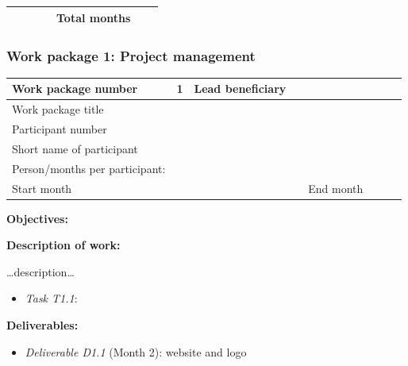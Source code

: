 \documentclass[]{article}
\begin{document}
\begin{longtable}[]{@{}lllllll@{}}
\begin{minipage}[t]{0.11\columnwidth}
\strut
\end{minipage} & \begin{minipage}[t]{0.13\columnwidth}\raggedright
\strut
\end{minipage} & \begin{minipage}[t]{0.14\columnwidth}\raggedright
\strut
\end{minipage} & \begin{minipage}[t]{0.19\columnwidth}\raggedright
\strut
\end{minipage} & \begin{minipage}[t]{0.09\columnwidth}\raggedright
Total months\strut
\end{minipage} & \begin{minipage}[t]{0.08\columnwidth}\raggedright
\strut
\end{minipage} & \begin{minipage}[t]{0.07\columnwidth}\raggedright
\strut
\end{minipage}\tabularnewline
\bottomrule
\end{longtable}

\subsubsection{Work package 1: Project management}\label{work-package-1-project-management}

\begin{longtable}[]{@{}llllllll@{}}
\toprule
Work package number & 1 & Lead beneficiary & & & & &\tabularnewline
\midrule
\endhead
Work package title & & & & & & &\tabularnewline
Participant number & & & & & & &\tabularnewline
Short name of participant & & & & & & &\tabularnewline
Person/months per participant: & & & & & & &\tabularnewline
Start month & & & & End month & & &\tabularnewline
\bottomrule
\end{longtable}

\textbf{Objectives:}

\textbf{Description of work:}

\ldots{}description\ldots{}

\begin{itemize}

\item
  \emph{Task T1.1}:
\end{itemize}

\textbf{Deliverables:}

\begin{itemize}

\item
  \emph{Deliverable D1.1} (Month 2): website and logo
\end{itemize}
\end{document}
